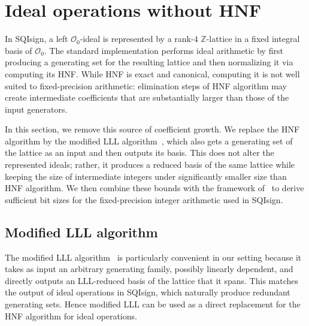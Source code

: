\section{Ideal operations without HNF}
\label{sec:ideal}

In SQIsign, a left $\mathcal O_0$-ideal is represented by a rank-$4$ $\mathbb Z$-lattice in a fixed integral basis of $\mathcal O_0$. The standard implementation performs ideal arithmetic by first producing a generating set for the resulting lattice and then normalizing it via computing its HNF. While HNF is exact and canonical, computing it is not well suited to fixed-precision arithmetic: elimination steps of HNF algorithm may create intermediate coefficients that are substantially larger than those of the input generators.

In this section, we remove this source of coefficient growth. We replace the HNF algorithm by the modified LLL algorithm~\cite{Poh87,NS09}, which also gets a generating set of the lattice as an input and then outputs its basis. This does not alter the represented ideals; rather, it produces a reduced basis of the same lattice while keeping the size of intermediate integers under significantly smaller size than HNF algorithm. We then combine these bounds with the framework of~\cite{KLKL25} to derive sufficient bit sizes for the fixed-precision integer arithmetic used in SQIsign.


\subsection{Modified LLL algorithm}
\label{subsec:modifiedLLL}

The modified LLL algorithm~\cite{Poh87} is particularly convenient in our setting because it takes as input an arbitrary generating family, possibly linearly dependent, and directly outputs an LLL-reduced basis of the lattice that it spans. This matches the output of ideal operations in SQIsign, which naturally produce redundant generating sets. Hence modified LLL can be used as a direct replacement for the HNF algorithm for ideal operations.

